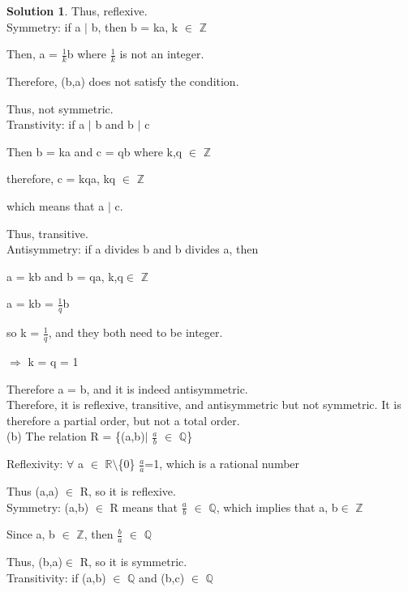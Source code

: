 \documentclass{article}
\theoremstyle{definition}
\newtheorem*{solution}{Solution}
\begin{document}
\begin{solution}
Thus, reflexive.\\


Symmetry: if a \(|\) b, then b = ka, k \(\in\) \(\mathbb{Z}\)

Then, a = \(\frac{1}{k}\)b where \(\frac{1}{k}\) is not an integer.

Therefore, (b,a) does not satisfy the condition.

Thus, not symmetric.\\


Transtivity: if a \(|\) b and b \(|\) c

Then b = ka and c = qb where k,q \(\in\) \(\mathbb{Z}\)

therefore, c = kqa, kq \(\in\) \(\mathbb{Z}\)

which means that a \(|\) c.

Thus, transitive.\\

Antisymmetry: if a divides b and b divides a, then

a = kb and b = qa, k,q\(\in\) \(\mathbb{Z}\)

a = kb = \(\frac{1}{q}\)b

so k = \(\frac{1}{q}\), and they both need to be integer.

\(\Rightarrow\) k = q = 1

Therefore a = b, and it is indeed antisymmetric.\\

Therefore, it is reflexive, transitive, and antisymmetric but not symmetric. It is therefore a partial order, but not a total order.\\



(b) The relation R = \{(a,b)\(|\) \(\frac{a}{b}\) \(\in\) \(\mathbb{Q}\)\}

Reflexivity: \(\forall\) a \(\in\) \(\mathbb{R}\)\(\setminus\)\{0\} \(\frac{a}{a}\)=1, which is a rational number

Thus (a,a) \(\in\) R, so it is reflexive.\\

Symmetry: (a,b) \(\in\) R means that \(\frac{a}{b}\) \(\in\) \(\mathbb{Q}\), which implies that a, b\(\in\) \(\mathbb{Z}\)

Since a, b \(\in\) \(\mathbb{Z}\), then \(\frac{b}{a}\) \(\in\) \(\mathbb{Q}\)

Thus, (b,a)\(\in\) R, so it is symmetric.\\

Transitivity: if (a,b) \(\in\) \(\mathbb{Q}\) and (b,c) \(\in\) \(\mathbb{Q}\)


\end{solution}
\end{document}
